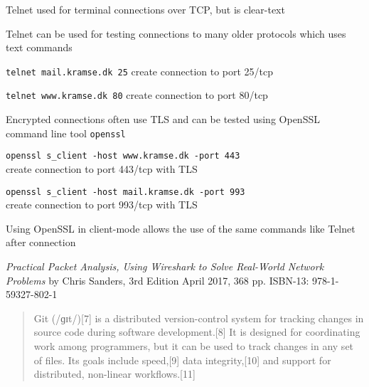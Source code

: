 \documentclass[Screen16to9,17pt]{foils}
\begin{document}

\begin{list1}
\item Telnet used for terminal connections over TCP, but is clear-text
\item Telnet can be used for testing connections to many older protocols which uses text commands
\begin{list2}
\item \verb+telnet mail.kramse.dk 25+ create connection to port 25/tcp
\item \verb+telnet www.kramse.dk 80+ create connection to port 80/tcp
\end{list2}
\item Encrypted connections often use TLS and can be tested using OpenSSL command line tool \verb+openssl+
\begin{list2}
\item \verb+openssl s_client -host www.kramse.dk -port 443+\\
create connection to port 443/tcp with TLS
\item \verb+openssl s_client -host mail.kramse.dk -port 993+\\
create connection to port 993/tcp with TLS
\end{list2}
\item Using OpenSSL in client-mode allows the use of the same commands like Telnet after connection
\end{list1}





\emph{Practical Packet Analysis,
Using Wireshark to Solve Real-World Network Problems}
by Chris Sanders, 3rd Edition
April 2017, 368 pp.
ISBN-13:
978-1-59327-802-1





\begin{quote}
Git (/ɡɪt/)[7] is a distributed version-control system for tracking changes in source code during software development.[8] It is designed for coordinating work among programmers, but it can be used to track changes in any set of files. Its goals include speed,[9] data integrity,[10] and support for distributed, non-linear workflows.[11]
\end{quote}
\end{document}
